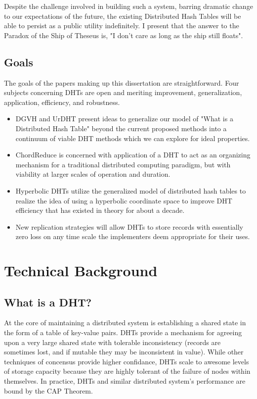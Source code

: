 Despite the challenge involved in building such a system, barring dramatic change to our expectations of the future, the existing Distributed Hash Tables will be able to persist as a public utility indefinitely.
I present that the answer to the Paradox of the Ship of Theseus is, "I don't care as long as the ship still floats".

\section{Goals}

The goals of the papers making up this dissertation are straightforward.
Four subjects concerning DHTs are open and meriting improvement, generalization, application, efficiency, and robustness. 
\begin{itemize}

\item DGVH and UrDHT present ideas to generalize our model of "What is a Distributed Hash Table" beyond the current proposed methods into a continuum of viable DHT methods which we can explore for ideal properties. 

\item ChordReduce is concerned with application of a DHT to act as an organizing mechanism for a traditional distributed computing paradigm, but with viability at larger scales of operation and duration.

\item Hyperbolic DHTs utilize the generalized model of distributed hash tables to realize the idea of using a hyperbolic coordinate space to improve DHT efficiency that has existed in theory for about a decade.

\item New replication strategies will allow DHTs to store records with essentially zero loss on any time scale the implementers deem appropriate for their uses. 


\end{itemize}



\chapter{Technical Background}
\section{What is a DHT?}
At the core of maintaining a distributed system is establishing a shared state in the form of a table of key-value pairs.
DHTs provide a mechanism for agreeing upon a very large shared state with tolerable inconsistency (records are sometimes lost, and if mutable they may be inconsistent in value).
While other techniques of concensus provide higher confidance, DHTs scale to awesome levels of storage capacity because they are highly tolerant of the failure of nodes within themselves.
In practice, DHTs and similar distributed system's performance are bound by the CAP Theorem\cite{brewer2010certain}.


